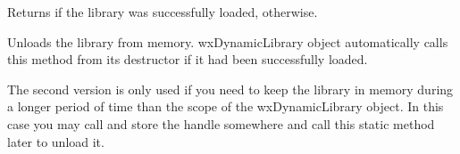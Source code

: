 Returns \true if the library was successfully loaded, \false otherwise.

\label{wxdynamiclibraryunload}



Unloads the library from memory. wxDynamicLibrary object automatically calls
this method from its destructor if it had been successfully loaded.

The second version is only used if you need to keep the library in memory
during a longer period of time than the scope of the wxDynamicLibrary object.
In this case you may call  and store
the handle somewhere and call this static method later to unload it.

